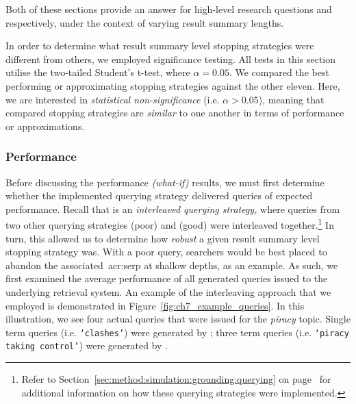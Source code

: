 Both of these sections provide an answer for high-level research questions  and  respectively, under the context of varying result summary lengths.

In order to determine what result summary level stopping strategies were different from others, we employed significance testing. All tests in this section utilise the two-tailed Student's t-test, where $\alpha=0.05$. We compared the best performing or approximating stopping strategies against the other eleven. Here, we are interested in \emph{statistical non-significance} (i.e. $\alpha > 0.05$), meaning that compared stopping strategies are \emph{similar} to one another in terms of performance or approximations.

\subsubsection{Performance}\label{sec:snippets:simulations:results:perf}
Before discussing the performance \emph{(what-if)} results, we must first determine whether the implemented querying strategy  delivered queries of expected performance. Recall that  is an \emph{interleaved querying strategy,} where queries from two other querying strategies  (poor) and  (good) were interleaved together.\footnote{Refer to Section~\ref{sec:method:simulation:grounding:querying} on page~\pageref{sec:method:simulation:grounding:querying} for additional information on how these querying strategies were implemented.} In turn, this allowed us to determine how \emph{robust} a given result summary level stopping strategy was. With a poor query, searchers would be best placed to abandon the associated~\gls{acr:serp} at shallow depths, as an example. As such, we first examined the average performance of all generated queries issued to the underlying retrieval system. An example of the interleaving approach that we employed is demonstrated in Figure~\ref{fig:ch7_example_queries}. In this illustration, we see four actual queries that were issued for the \emph{piracy} topic. Single term queries (i.e. \texttt{`clashes'}) were generated by ; three term queries (i.e. \texttt{`piracy taking control'}) were generated by .

